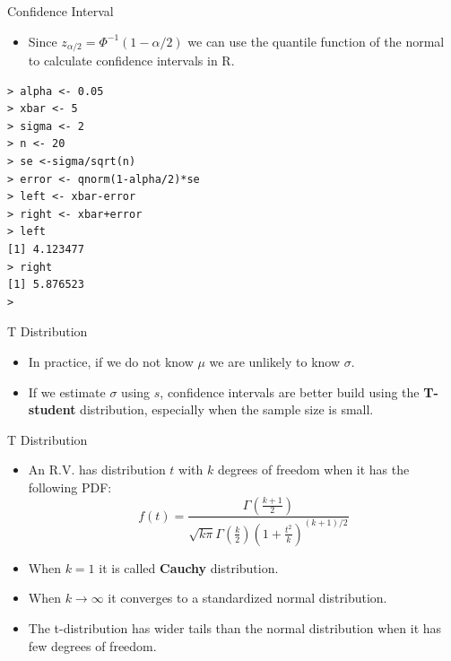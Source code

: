 \documentclass[handout]{beamer}
\begin{document}
\begin{frame}[fragile]{Confidence Interval}

\scriptsize{
\begin{itemize}
 \item Since $z_{\alpha/2} = \Phi^{-1}(1-\alpha/2)$ we can use the quantile function of the normal to calculate confidence intervals in R.
\end{itemize}


\begin{verbatim}
> alpha <- 0.05
> xbar <- 5
> sigma <- 2
> n <- 20
> se <-sigma/sqrt(n)
> error <- qnorm(1-alpha/2)*se
> left <- xbar-error
> right <- xbar+error
> left
[1] 4.123477
> right
[1] 5.876523
>
\end{verbatim}
}



\end{frame}

\begin{frame}{T Distribution}
\scriptsize{
\begin{itemize}
 \item In practice, if we do not know $\mu$ we are unlikely to know $\sigma$.
 \item If we estimate $\sigma$ using $s$, confidence intervals are better build using the \textbf{T-student} distribution, especially when the sample size is small.
\end{itemize}

\begin{block}{T Distribution}
\begin{itemize}
 \item An R.V. has distribution $t$ with $k$ degrees of freedom when it has the following PDF:
\begin{displaymath}
 f(t)=\frac{\Gamma(\frac{k+1}{2})}{\sqrt{k\pi}\Gamma(\frac k2)(1+\frac{t^2}{k})^{(k+1)/2}}
\end{displaymath}
\item  When $k=1$ it is called \textbf{Cauchy} distribution.
\item When $k\rightarrow \infty$ it converges to a standardized normal distribution.
 \item The t-distribution has wider tails than the normal distribution when it has few degrees of freedom.


\end{itemize}

 
\end{block}




} 
\end{frame}
\end{document}
